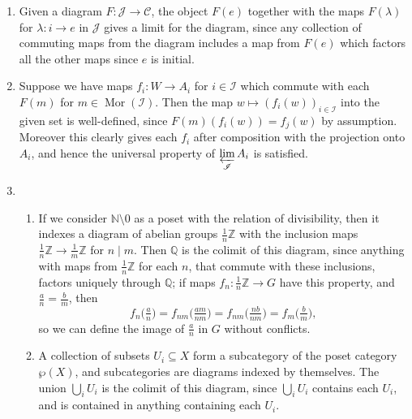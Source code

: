 \documentclass{report}
\newcommand{\divides}{\mathrel{\mid}} %
\newcommand{\limit}{\varprojlim} %
\newcommand{\I}{\mathscr{I}}
\newcommand{\J}{\mathscr{J}}
\newcommand{\scrC}{\mathscr{C}}
\newcommand{\N}{\mathbb{N}}
\newcommand{\Z}{\mathbb{Z}}
\newcommand{\Q}{\mathbb{Q}}
\DeclareMathOperator{\Mor}{Mor}
\begin{document}
\begin{enumerate}[label=\textbf{1.4.\Alph*.}]
	\item Given a diagram $F:\J\to\scrC$, the object $F(e)$ together with the
	      maps $F(\lambda)$ for $\lambda:i\to e$ in $\J$ gives a limit for the
	      diagram, since any collection of commuting maps from the diagram
	      includes a map from $F(e)$ which factors all the other maps since $e$
	      is initial.

	\item Suppose we have maps $f_i:W\to A_i$ for $i\in\I$ which
	      commute with each $F(m)$ for $m\in\Mor(\I)$. Then the map
	      $w\mapsto (f_i(w))_{i\in\I}$ into the given set is
	      well-defined, since $F(m)(f_i(w))=f_j(w)$ by assumption. Moreover
	      this clearly gives each $f_i$ after composition with the projection
	      onto $A_i$, and hence the universal property of
	      $\limit\limits_\I A_i$ is satisfied.

	\item
	      \begin{enumerate}[label=(\alph*)]
		      \item If we consider $\N\setminus0$ as a poset with the relation
		            of divisibility, then it indexes a diagram of abelian groups
		            $\frac{1}{n}\Z$ with the inclusion maps
		            $\frac{1}{n}\Z\to\frac{1}{m}\Z$ for $n\divides m$. Then $\Q$
		            is the colimit of this diagram, since anything with maps
		            from $\frac{1}{n}\Z$ for each $n$, that commute with these
		            inclusions, factors uniquely through $\Q$; if maps
		            $f_n:\frac{1}{n}\Z\to G$ have this property, and
		            $\frac{a}{n}=\frac{b}{m}$, then
		            \begin{equation*}
			            f_n\bigl(\tfrac{a}{n}\bigr)
			            = f_{nm}\bigl(\tfrac{am}{nm}\bigr)
			            = f_{nm}\bigl(\tfrac{nb}{nm}\bigr)
			            = f_m\bigl(\tfrac{b}{m}\bigr),
		            \end{equation*}
		            so we can define the image of $\frac{a}{n}$ in $G$
		            without conflicts.

		      \item A collection of subsets $U_i\subseteq X$ form a
		            subcategory of the poset category $\wp(X)$, and
		            subcategories are diagrams indexed by themselves. The union
		            $\bigcup_iU_i$ is the colimit of this diagram, since
		            $\bigcup_iU_i$ contains each $U_i$, and is contained in
		            anything containing each $U_i$.
	      \end{enumerate}


\end{enumerate}
\end{document}
